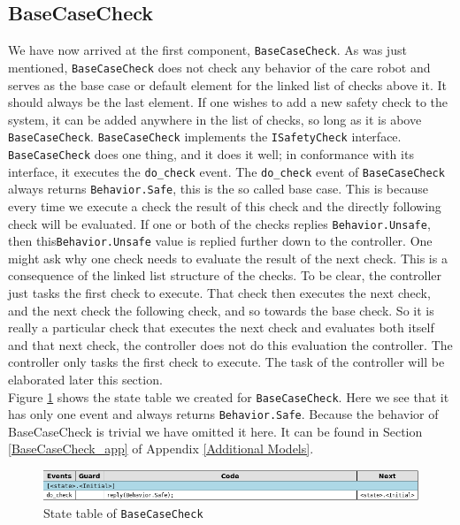 \documentclass[12pt]{scrreprt}
\begin{document}
\subsection{BaseCaseCheck}
We have now arrived at the first component, \texttt{BaseCaseCheck}. As was just mentioned, \texttt{BaseCaseCheck} does not check any behavior of the care robot and serves as the base case or default element for the linked list of checks above it. It should always be the last element. If one wishes to add a new safety check to the system, it can be added anywhere in the list of checks, so long as it is above \texttt{BaseCaseCheck}. \texttt{BaseCaseCheck} implements the \texttt{ISafetyCheck} interface. \texttt{BaseCaseCheck} does one thing, and it does it well; in conformance with its interface, it executes the \texttt{do\_check} event. The \texttt{do\_check} event of \texttt{BaseCaseCheck} always returns \texttt{Behavior.Safe}, this is the so called base case. This is because every time we execute a check the result of this check and the directly following check will be evaluated. If one or both of the checks replies \texttt{Behavior.Unsafe}, then this\texttt{Behavior.Unsafe} value is replied further down to the controller. One might ask why one check needs to evaluate the result of the next check. This is a consequence of the linked list structure of the checks. To be clear, the controller just tasks the first check to execute. That check then executes the next check, and the next check the following check, and so towards the base check. So it is really a particular check that executes the next check and evaluates both itself and that next check, the controller does not do this evaluation the controller. The controller only tasks the first check to execute. The task of the controller will be elaborated later this section. 
\\
Figure \ref{fig:basecasechekc_state_table} shows the state table we created for \texttt{BaseCaseCheck}. Here we see that it has only one event and always returns \texttt{Behavior.Safe}. Because the behavior of BaseCaseCheck is trivial we have omitted it here. It can be found in Section \ref{BaseCaseCheck_app} of Appendix \ref{Additional Models}.

\begin{figure}[H]
    \centering
    \includegraphics[width=\textwidth]{Figures/results/modelling_figures/BaseCaseCheck/BaseCaseCheck_state_table.png}
    \caption{State table of \texttt{BaseCaseCheck}}
    \label{fig:basecasechekc_state_table}
\end{figure}
\end{document}
